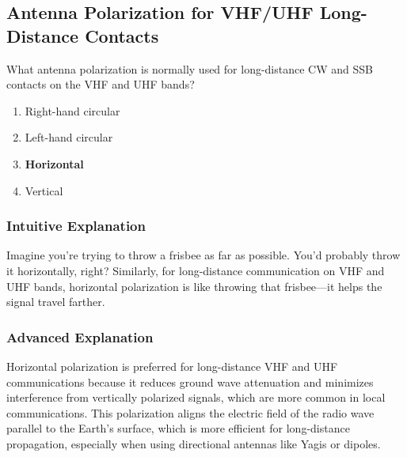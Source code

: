 \subsection{Antenna Polarization for VHF/UHF Long-Distance Contacts}
\label{T3A03}

\begin{tcolorbox}[colback=gray!10!white,colframe=black!75!black,title=T3A03]
What antenna polarization is normally used for long-distance CW and SSB contacts on the VHF and UHF bands?
\begin{enumerate}[noitemsep]
    \item Right-hand circular
    \item Left-hand circular
    \item \textbf{Horizontal}
    \item Vertical
\end{enumerate}
\end{tcolorbox}

\subsubsection*{Intuitive Explanation}
Imagine you're trying to throw a frisbee as far as possible. You'd probably throw it horizontally, right? Similarly, for long-distance communication on VHF and UHF bands, horizontal polarization is like throwing that frisbee—it helps the signal travel farther.

\subsubsection*{Advanced Explanation}
Horizontal polarization is preferred for long-distance VHF and UHF communications because it reduces ground wave attenuation and minimizes interference from vertically polarized signals, which are more common in local communications. This polarization aligns the electric field of the radio wave parallel to the Earth's surface, which is more efficient for long-distance propagation, especially when using directional antennas like Yagis or dipoles.